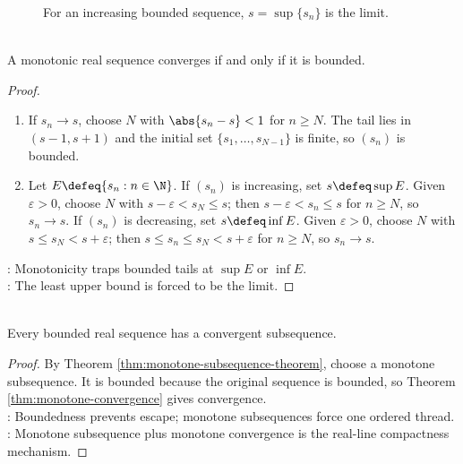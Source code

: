 \begin{figure}[H]
  \centering
  
  \caption{For an increasing bounded sequence, $s=\sup\{s_n\}$ is the limit.}
  \label{fig:monotone-convergence-supremum}
\end{figure}

\begin{theorem} \label{thm:monotone-convergence} \\
A monotonic real sequence converges if and only if it is bounded.
\begin{proof}
\begin{enumerate}[label=\roman*.]
\setlength{\itemsep}{0pt}
\item[$(\Rightarrow)$] If $s_n\to s$, choose $N$ with $\abs{s_n-s}<1$ for $n\geq N$. The tail lies in $(s-1,s+1)$ and the initial set $\{s_1,\ldots,s_{N-1}\}$ is finite, so $(s_n)$ is bounded.
\item[$(\Leftarrow)$] Let $E\defeq\{s_n:n\in\N\}$. If $(s_n)$ is increasing, set $s\defeq\sup E$. Given $\varepsilon>0$, choose $N$ with $s-\varepsilon<s_N\leq s$; then $s-\varepsilon<s_n\leq s$ for $n\geq N$, so $s_n\to s$. If $(s_n)$ is decreasing, set $s\defeq\inf E$. Given $\varepsilon>0$, choose $N$ with $s\leq s_N<s+\varepsilon$; then $s\leq s_n\leq s_N<s+\varepsilon$ for $n\geq N$, so $s_n\to s$.
\end{enumerate}
: Monotonicity traps bounded tails at $\sup E$ or $\inf E$.\\
: The least upper bound is forced to be the limit.
\end{proof}
\end{theorem}

\begin{theorem} \label{thm:bolzano-weierstrass-real-sequence} \\
Every bounded real sequence has a convergent subsequence.
\begin{proof}
By Theorem \ref{thm:monotone-subsequence-theorem}, choose a monotone subsequence. It is bounded because the original sequence is bounded, so Theorem \ref{thm:monotone-convergence} gives convergence.\\
: Boundedness prevents escape; monotone subsequences force one ordered thread.\\
: Monotone subsequence plus monotone convergence is the real-line compactness mechanism.
\end{proof}
\end{theorem}

